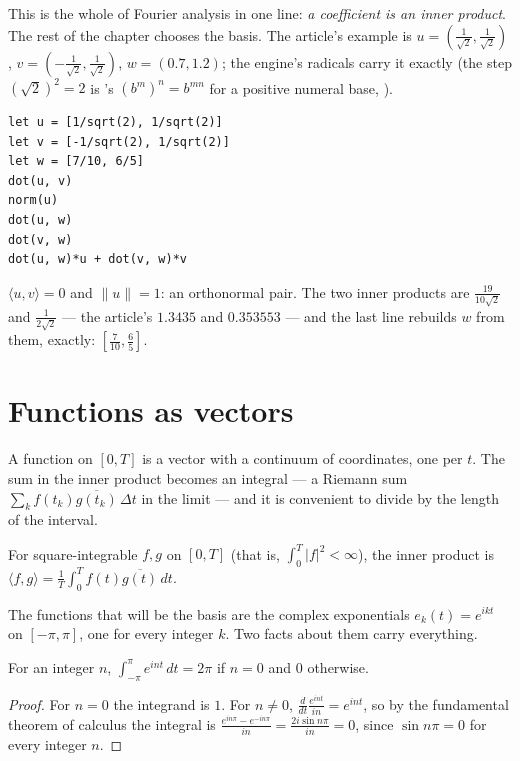 This is the whole of Fourier analysis in one line: \emph{a coefficient is an inner product}. The
rest of the chapter chooses the basis. The article's example is $u = (\tfrac{1}{\sqrt 2},
\tfrac{1}{\sqrt 2})$, $v = (-\tfrac{1}{\sqrt 2}, \tfrac{1}{\sqrt 2})$, $w = (0.7, 1.2)$; the
engine's radicals carry it exactly (the step $(\sqrt 2)^{2} = 2$ is 's
$(b^m)^n = b^{mn}$ for a positive numeral base, ).

\begin{trybox}
\begin{verbatim}
let u = [1/sqrt(2), 1/sqrt(2)]
let v = [-1/sqrt(2), 1/sqrt(2)]
let w = [7/10, 6/5]
dot(u, v)
norm(u)
dot(u, w)
dot(v, w)
dot(u, w)*u + dot(v, w)*v
\end{verbatim}
  $\langle u, v\rangle = 0$ and $\|u\| = 1$: an orthonormal pair. The two inner products are
  $\frac{19}{10\sqrt 2}$ and $\frac{1}{2\sqrt 2}$ --- the article's $1.3435$ and $0.353553$ ---
  and the last line rebuilds $w$ from them, exactly: $[\tfrac{7}{10}, \tfrac{6}{5}]$.
\end{trybox}

\section{Functions as vectors}

A function on $[0, T]$ is a vector with a continuum of coordinates, one per $t$. The sum in the
inner product becomes an integral --- a Riemann sum $\sum_k f(t_k)\overline{g(t_k)}\,\Delta t$
in the limit --- and it is convenient to divide by the length of the interval.

\begin{definition}
  For square-integrable $f, g$ on $[0, T]$ (that is, $\int_0^T |f|^2 < \infty$), the inner product
  is $\langle f, g\rangle = \frac{1}{T}\int_0^T f(t)\overline{g(t)}\,dt$.
\end{definition}

The functions that will be the basis are the complex exponentials $e_k(t) = e^{ikt}$ on $[-\pi,
\pi]$, one for every integer $k$. Two facts about them carry everything.

\begin{lemma}\label{lem:expint}
  For an integer $n$, $\int_{-\pi}^{\pi} e^{int}\,dt = 2\pi$ if $n = 0$ and $0$ otherwise.
\end{lemma}
\begin{proof}
  For $n = 0$ the integrand is $1$. For $n \neq 0$, $\frac{d}{dt}\frac{e^{int}}{in} = e^{int}$,
  so by the fundamental theorem of calculus the integral is $\frac{e^{in\pi} - e^{-in\pi}}{in} =
  \frac{2i\sin n\pi}{in} = 0$, since $\sin n\pi = 0$ for every integer $n$.
\end{proof}

